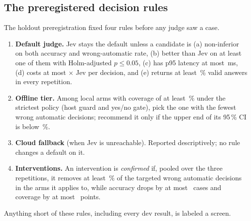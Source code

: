 \subsection{The preregistered decision rules}\label{sec:rules}

The holdout preregistration fixed four rules before any judge saw a case.
\begin{enumerate}
  \item \textbf{Default judge.} Jev stays the default unless a candidate is (a) non-inferior on both
    accuracy and wrong-automatic rate, (b) better than Jev on at least one of them with Holm-adjusted
    $p \le 0.05$, (c) has p95 latency at most \RuleOneMaxPninetyfive\,ms, (d) costs at most
    \RuleOneCostX$\times$ Jev per decision, and (e) returns at least \RuleOneValidShare\,\% valid answers
    in every repetition.
  \item \textbf{Offline tier.} Among local arms with coverage of at least \OffMinCovPct\,\% under the
    strictest policy (host guard and yes/no gate), pick the one with the fewest wrong automatic
    decisions; recommend it only if the upper end of its 95\,\% CI is below \OffMaxUpperPct\,\%.
  \item \textbf{Cloud fallback} (when Jev is unreachable). Reported descriptively; no rule changes a
    default on it.
  \item \textbf{Interventions.} An intervention is \emph{confirmed} if, pooled over the three
    repetitions, it removes at least \IConfirmReductionPct\,\% of the targeted wrong automatic decisions in the
    arms it applies to, while accuracy drops by at most \IConfirmAccCases\ cases and coverage by at most
    \IConfirmCovPts\ points.
\end{enumerate}
Anything short of these rules, including every dev result, is labeled a screen.
